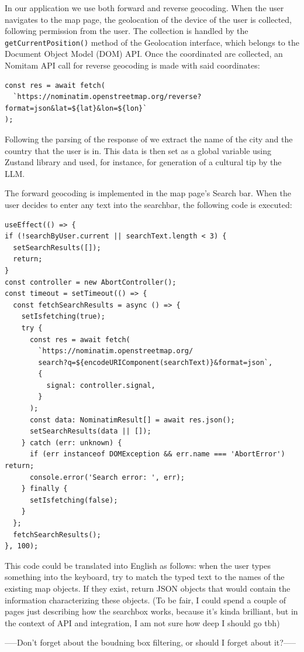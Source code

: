 In our application we use both forward and reverse geocoding. When the user navigates to the map page, the geolocation of the device of the user is collected, following permission from the user. The collection is handled by the \texttt{getCurrentPosition()} method of the Geolocation interface, which belongs to the Document Object Model (DOM) API. Once the coordinated are collected, an Nomitam API call for reverse geocoding is made with said coordinates:
\begin{verbatim}
const res = await fetch(
  `https://nominatim.openstreetmap.org/reverse?format=json&lat=${lat}&lon=${lon}`
);
\end{verbatim}
Following the parsing of the response of we extract the name of the city and the country that the user is in. This data is then set as a global variable using Zustand library and used, for instance, for generation of a cultural tip by the LLM.

The forward geocoding is implemented in the map page's Search bar. When the user decides to enter any text into the searchbar, the following code is executed:
\begin{verbatim}
useEffect(() => {
if (!searchByUser.current || searchText.length < 3) {
  setSearchResults([]);
  return;
}
const controller = new AbortController();
const timeout = setTimeout(() => {
  const fetchSearchResults = async () => {
    setIsfetching(true);
    try {
      const res = await fetch(
        `https://nominatim.openstreetmap.org/
        search?q=${encodeURIComponent(searchText)}&format=json`,
        {
          signal: controller.signal,
        }
      );
      const data: NominatimResult[] = await res.json();
      setSearchResults(data || []);
    } catch (err: unknown) {
      if (err instanceof DOMException && err.name === 'AbortError') return;
      console.error('Search error: ', err);
    } finally {
      setIsfetching(false);
    }
  };
  fetchSearchResults();
}, 100);
\end{verbatim}
This code could be translated into English as follows: when the user types something into the keyboard, try to match the typed text to the names of the existing map objects. If they exist, return JSON objects that would contain the information characterizing these objects. (To be fair, I could spend a couple of pages just describing how the searchbox works, because it's kinda brilliant, but in the context of API and integration, I am not sure how deep I should go tbh)


-----Don't forget about the boudning box filtering, or should I forget about it?-----

